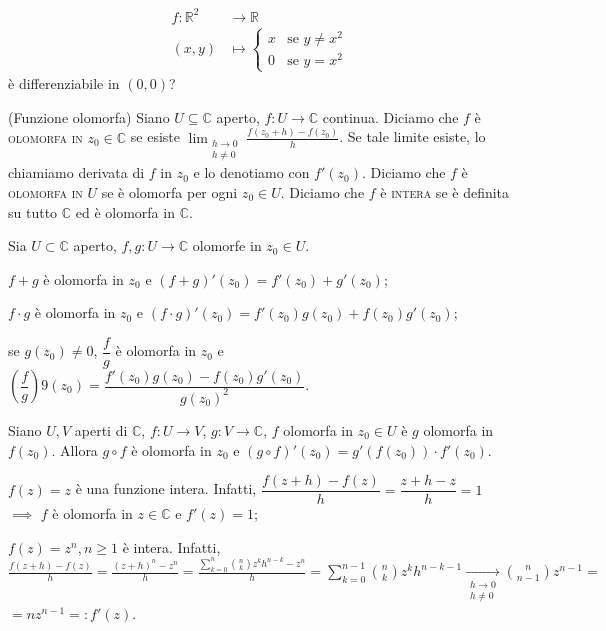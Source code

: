 \begin{exc}
  \begin{align*}
    f:\mathbb{R}^2 &\rightarrow \mathbb{R}\\
    (x, y) &\mapsto \begin{cases} x & \mbox{se }y\not=x^2 \\ 0 & \mbox{se }y=x^2 \end{cases}
  \end{align*}
  è differenziabile in $(0, 0)$?
\end{exc}

\begin{defn}
  (Funzione olomorfa) Siano $U \subseteq \mathbb{C}$ aperto, $f:U \rightarrow \mathbb{C}$ continua. Diciamo che $f$ è \textsc{olomorfa in $z_0 \in \mathbb{C}$} se esiste $\displaystyle \lim_{\substack{h \rightarrow 0 \\ h\not=0}} \frac{f(z_0+h)-f(z_0)}{h}$. Se tale limite esiste, lo chiamiamo derivata di $f$ in $z_0$ e lo denotiamo con $f'(z_0)$.
  Diciamo che $f$ è \textsc{olomorfa in $U$} se è olomorfa per ogni $z_0 \in U$. Diciamo che $f$ è \textsc{intera} se è definita su tutto $\mathbb{C}$ ed è olomorfa in $\mathbb{C}$.
\end{defn}

\begin{prop}
  Sia $U \subset \mathbb{C}$ aperto, $f, g:U \rightarrow \mathbb{C}$ olomorfe in $z_0 \in U$.
  \begin{nlist}
    \item $f+g$ è olomorfa in $z_0$ e $(f+g)'(z_0)=f'(z_0)+g'(z_0)$;
    \item $f \cdot g$ è olomorfa in $z_0$ e $(f \cdot g)'(z_0)=f'(z_0)g(z_0)+f(z_0)g'(z_0)$;
    \item se $g(z_0) \not=0$, $\dfrac{f}{g}$ è olomorfa in $z_0$ e $\left(\dfrac{f}{g}\right)9(z_0)=\dfrac{f'(z_0)g(z_0)-f(z_0)g'(z_0)}{g(z_0)^2}$.
  \end{nlist}
\end{prop}

\begin{prop}
  Siano $U, V$ aperti di $\mathbb{C}$, $f:U \rightarrow V$, $g:V \rightarrow \mathbb{C}$, $f$ olomorfa in $z_0 \in U$ è $g$ olomorfa in $f(z_0)$. Allora $g \circ f$ è olomorfa in $z_0$ e $(g \circ f)'(z_0)=g'(f(z_0))\cdot f'(z_0)$.
\end{prop}

\begin{ex}
  \begin{nlist}
    \item $f(z)=z$ è una funzione intera. Infatti, $\dfrac{f(z+h)-f(z)}{h}=\dfrac{z+h-z}{h}=1$ $\implies$ $f$ è olomorfa in $z \in \mathbb{C}$ e $f'(z)=1$;
    \item $f(z)=z^n, n \ge 1$ è intera.
    Infatti, $\displaystyle \frac{f(z+h)-f(z)}{h}=\frac{(z+h)^n-z^n}{h}=\frac{\sum_{k=0}^n \binom{n}{k}z^kh^{n-k}-z^n}{h}=\sum_{k=0}^{n-1} \binom{n}{k}z^kh^{n-k-1} \xrightarrow[\substack{h \rightarrow 0 \\ h\not=0}]{} \binom{n}{n-1} z^{n-1}=$\\
    $=nz^{n-1}=:f'(z)$.
  \end{nlist}
\end{ex}

